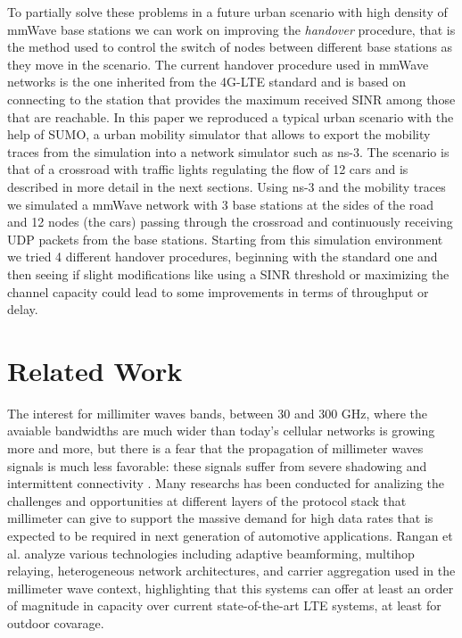 \documentclass[conference,10pt]{IEEEtran}
\begin{document}
To partially solve these problems in a future urban scenario with high density of mmWave base stations we can work on improving the \emph{handover} procedure, that is the method used to control the switch of nodes between different base stations as they move in the scenario. The current handover procedure used in mmWave networks is the one inherited from the 4G-LTE standard and is based on connecting to the station that provides the maximum received SINR among those that are reachable. In this paper we reproduced a typical urban scenario with the help of SUMO, a urban mobility simulator that allows to export the mobility traces from the simulation into a network simulator such as ns-3. The scenario is that of a crossroad with traffic lights regulating the flow of 12 cars and is described in more detail in the next sections. Using ns-3 and the mobility traces we simulated a mmWave network with 3 base stations at the sides of the road and 12 nodes (the cars) passing through the crossroad and continuously receiving UDP packets from the base stations. Starting from this simulation environment we tried 4 different handover procedures, beginning with the standard one and then seeing if slight modifications like using a SINR threshold or maximizing the channel capacity could lead to some improvements in terms of throughput or delay. 




\section{Related Work}\label{sec:sota}
The interest for millimiter waves bands, between 30 and 300 GHz, where the avaiable bandwidths are much wider than today's cellular networks is growing more and more, but there is a fear that the propagation of millimeter waves signals is much less favorable: these signals suffer from severe shadowing and intermittent connectivity \cite{mmwwicom} \cite{mmwcomsy}. Many researchs has been conducted for analizing the challenges and opportunities at different layers of the protocol stack that millimeter can give to support the massive demand for high data rates that is expected to be required in next generation of automotive applications.
Rangan et al. \cite{mmwpac} analyze various technologies including adaptive beamforming, multihop relaying, heterogeneous network architectures, and carrier aggregation used in the millimeter wave context, highlighting that this systems can offer at least an order of magnitude in capacity over current state-of-the-art LTE systems, at least for outdoor covarage.
\end{document}
